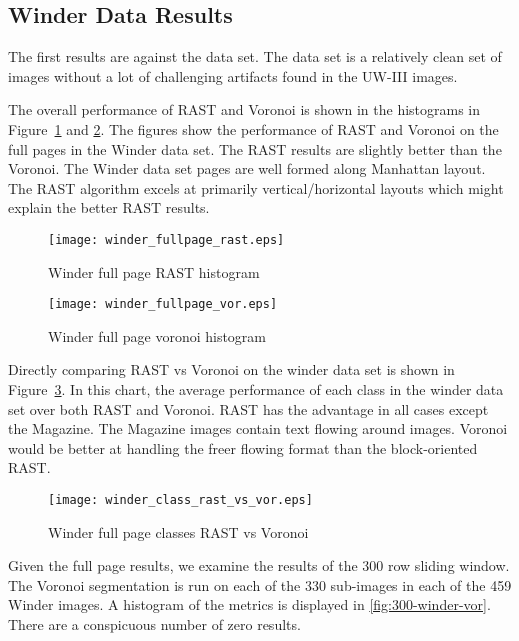 \documentclass[conference]{IEEEtran}
\begin{document}
%
%
\subsection{Winder Data Results}

The first results are against the \cite{IEEEhowto:Winder} data set. The \cite{IEEEhowto:Winder} data set is a
relatively clean set of images without a lot of challenging artifacts found in
the UW-III images.

The overall performance of RAST and Voronoi is shown in the histograms in
Figure~\ref{fig:winder-fullpage-rast} and \ref{fig:winder-fullpage-vor}. The figures
show the performance of RAST and Voronoi on the full pages in the Winder
data set. The RAST results are slightly better than the Voronoi. The Winder
data set pages are well formed along Manhattan layout. The RAST algorithm
excels at primarily vertical/horizontal layouts which might explain the better
RAST results.

\begin{figure}[winder-fullpage-rast]
\texttt{[image: winder\_fullpage\_rast.eps]}
\caption{Winder full page RAST histogram}
\label{fig:winder-fullpage-rast}
\end{figure}

\begin{figure}[winder-fullpage-vor]
\texttt{[image: winder\_fullpage\_vor.eps]}
\caption{Winder full page voronoi histogram}
\label{fig:winder-fullpage-vor}
\end{figure}

Directly comparing RAST vs Voronoi on the winder data set is shown in
Figure~\ref{fig:winder-class-rast-vs-vor}. In this chart, the average
performance of each class in the winder data set over both RAST and Voronoi.
RAST has the advantage in all cases except the Magazine. The Magazine images
contain text flowing around images. Voronoi would be better at handling the
freer flowing format than the block-oriented RAST.

\begin{figure}[winder-class-rast-vs-vor]
\texttt{[image: winder\_class\_rast\_vs\_vor.eps]}
\caption{Winder full page classes RAST vs Voronoi}
\label{fig:winder-class-rast-vs-vor}
\end{figure}

Given the full page results, we examine the results of the 300 row sliding
window. The Voronoi segmentation is run on each of the 330 sub-images in each of
the 459 Winder images. A histogram of the metrics is displayed in
\ref{fig:300-winder-vor}. There are a conspicuous number of zero results. 
\end{document}

